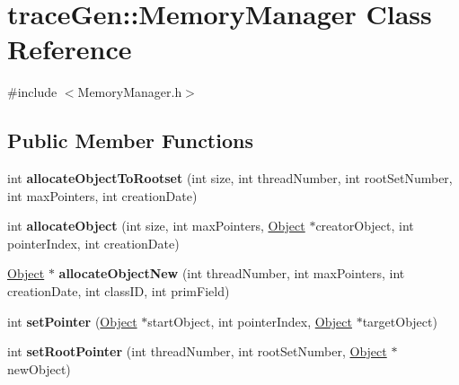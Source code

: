 \hypertarget{classtrace_gen_1_1_memory_manager}{}\section{trace\+Gen\+:\+:Memory\+Manager Class Reference}
\label{classtrace_gen_1_1_memory_manager}


{\ttfamily \#include $<$Memory\+Manager.\+h$>$}

\subsection*{Public Member Functions}
\begin{DoxyCompactItemize}
\item 
\hypertarget{classtrace_gen_1_1_memory_manager_a7dbf10e8206d58e565b5fd83992ce1dc}{}int {\bfseries allocate\+Object\+To\+Rootset} (int size, int thread\+Number, int root\+Set\+Number, int max\+Pointers, int creation\+Date)\label{classtrace_gen_1_1_memory_manager_a7dbf10e8206d58e565b5fd83992ce1dc}

\item 
\hypertarget{classtrace_gen_1_1_memory_manager_a0e0414c23479e2b9829277efbd0bb9e8}{}int {\bfseries allocate\+Object} (int size, int max\+Pointers, \hyperlink{classtrace_gen_1_1_object}{Object} $\ast$creator\+Object, int pointer\+Index, int creation\+Date)\label{classtrace_gen_1_1_memory_manager_a0e0414c23479e2b9829277efbd0bb9e8}

\item 
\hypertarget{classtrace_gen_1_1_memory_manager_ad3e6a83fe2c60aaab9a07a60d1111525}{}\hyperlink{classtrace_gen_1_1_object}{Object} $\ast$ {\bfseries allocate\+Object\+New} (int thread\+Number, int max\+Pointers, int creation\+Date, int class\+I\+D, int prim\+Field)\label{classtrace_gen_1_1_memory_manager_ad3e6a83fe2c60aaab9a07a60d1111525}

\item 
\hypertarget{classtrace_gen_1_1_memory_manager_aa0745732170782e1d216a8a01832d853}{}int {\bfseries set\+Pointer} (\hyperlink{classtrace_gen_1_1_object}{Object} $\ast$start\+Object, int pointer\+Index, \hyperlink{classtrace_gen_1_1_object}{Object} $\ast$target\+Object)\label{classtrace_gen_1_1_memory_manager_aa0745732170782e1d216a8a01832d853}

\item 
\hypertarget{classtrace_gen_1_1_memory_manager_a2224a0bf262c711a1c19da338ab7a6cc}{}int {\bfseries set\+Root\+Pointer} (int thread\+Number, int root\+Set\+Number, \hyperlink{classtrace_gen_1_1_object}{Object} $\ast$new\+Object)\label{classtrace_gen_1_1_memory_manager_a2224a0bf262c711a1c19da338ab7a6cc}


\end{DoxyCompactItemize}
